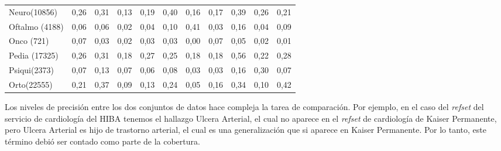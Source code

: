 \begin{table}[htb]
{\begin{tabular}{@{}lllllllllll@{}}
Neuro(10856)                                         & 0,26                  & 0,31                 & 0,13                  & 0,19               & 0,40                 & 0,16                   & 0,17                & 0,39                 & 0,26                   & 0,21                \\
Oftalmo (4188)                                       & 0,06                  & 0,06                 & 0,02                  & 0,04               & 0,10                 & 0,41                   & 0,03                & 0,16                 & 0,04                   & 0,09                \\
Onco (721)                                           & 0,07                  & 0,03                 & 0,02                  & 0,03               & 0,03                 & 0,00                   & 0,07                & 0,05                 & 0,02                   & 0,01                \\
Pedia (17325)                                        & 0,26                  & 0,31                 & 0,18                  & 0,27               & 0,25                 & 0,18                   & 0,18                & 0,56                 & 0,22                   & 0,28                \\
Psiqui(2373)                                         & 0,07                  & 0,13                 & 0,07                  & 0,06               & 0,08                 & 0,03                   & 0,03                & 0,16                 & 0,30                   & 0,07                \\
Orto(22555)                                          & 0,21                  & 0,37                 & 0,09                  & 0,13               & 0,24                 & 0,05                   & 0,16                & 0,34                 & 0,10                   & 0,42                \\ \bottomrule
\end{tabular}%
}
\end{table}

Los niveles de precisión entre los dos conjuntos de datos hace compleja la tarea de comparación. Por ejemplo, en el caso del \textit{refset} del servicio de cardiología del HIBA tenemos el hallazgo Ulcera Arterial, el cual no aparece en el \textit{refset} de cardiología de Kaiser Permanente, pero Ulcera Arterial es hijo de trastorno arterial, el cual es una generalización que si aparece en Kaiser Permanente. Por lo tanto, este término debió ser contado como parte de la cobertura.


